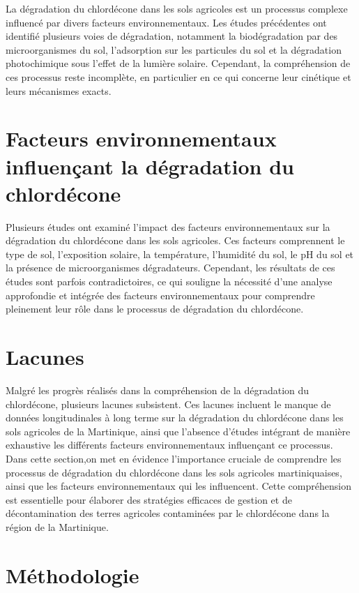 \documentclass{report}
\begin{document}
La dégradation du chlordécone dans les sols agricoles est un processus complexe influencé par divers facteurs environnementaux. Les études précédentes ont identifié plusieurs voies de dégradation, notamment la biodégradation par des microorganismes du sol, l'adsorption sur les particules du sol et la dégradation photochimique sous l'effet de la lumière solaire. Cependant, la compréhension de ces processus reste incomplète, en particulier en ce qui concerne leur cinétique et leurs mécanismes exacts.

\section{Facteurs environnementaux influençant la dégradation du chlordécone}


Plusieurs études ont examiné l'impact des facteurs environnementaux sur la dégradation du chlordécone dans les sols agricoles. Ces facteurs comprennent le type de sol, l'exposition solaire, la température, l'humidité du sol, le pH du sol et la présence de microorganismes dégradateurs. Cependant, les résultats de ces études sont parfois contradictoires, ce qui souligne la nécessité d'une analyse approfondie et intégrée des facteurs environnementaux pour comprendre pleinement leur rôle dans le processus de dégradation du chlordécone.

\section{Lacunes}


Malgré les progrès réalisés dans la compréhension de la dégradation du chlordécone, plusieurs lacunes subsistent. Ces lacunes incluent le manque de données longitudinales à long terme sur la dégradation du chlordécone dans les sols agricoles de la Martinique, ainsi que l'absence d'études intégrant de manière exhaustive les différents facteurs environnementaux influençant ce processus.
\\

Dans cette section,on met en évidence l'importance cruciale de comprendre les processus de dégradation du chlordécone dans les sols agricoles martiniquaises, ainsi que les facteurs environnementaux qui les influencent. Cette compréhension est essentielle pour élaborer des stratégies efficaces de gestion et de décontamination des terres agricoles contaminées par le chlordécone dans la région de la Martinique.



\section{Méthodologie}
\end{document}
